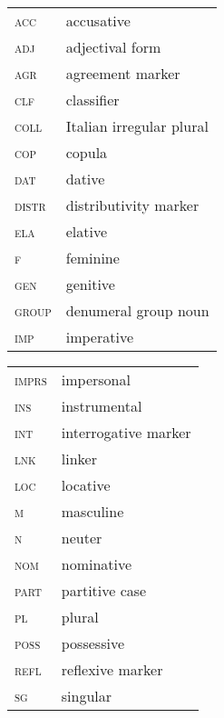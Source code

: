 \addchap{\lsAbbreviationsTitle}

\begin{tabularx}{.5\textwidth}{@{}lQ}
\textsc{acc} & accusative\\
\textsc{adj} & adjectival form\\
\textsc{agr} & agreement marker\\
\textsc{clf} & classifier\\
\textsc{coll} & Italian irregular plural\\
\textsc{cop} & copula\\
\textsc{dat} & dative\\
\textsc{distr} & distributivity marker\\
\textsc{ela} & elative\\
\textsc{f} & feminine\\
\textsc{gen} & genitive\\
\textsc{group} & denumeral group noun\\
\textsc{imp} & imperative\\
\end{tabularx}%
\begin{tabularx}{.5\textwidth}{lQ@{}}
\textsc{imprs} & impersonal\\
\textsc{ins} & instrumental\\
\textsc{int} & interrogative marker\\
\textsc{lnk} & linker\\
\textsc{loc} & locative\\
\textsc{m} & masculine\\
\textsc{n} & neuter\\
\textsc{nom} & nominative\\
\textsc{part} & partitive case\\
\textsc{pl} & plural\\
\textsc{poss} & possessive\\
\textsc{refl} & reflexive marker\\
\textsc{sg} & singular\\
\end{tabularx}


